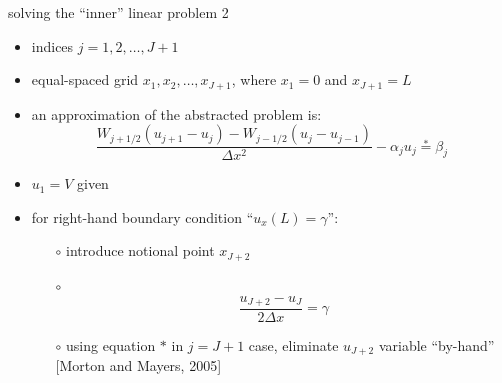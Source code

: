 \begin{frame}{solving the ``inner'' linear problem 2}

\begin{itemize}
\item indices $j=1,2,\dots,J+1$
\item equal-spaced grid $x_1,x_2,\dots,x_{J+1}$, where $x_1 = 0$ and $x_{J+1} = L$
\item an approximation of the abstracted problem is:
$$\frac{W_{j+1/2} (u_{j+1} - u_j) - W_{j-1/2} (u_{j} - u_{j-1})}{\Delta x^2} - \alpha_j u_j \stackrel{\ast}{=} \beta_j$$
\item $u_1 = V$ given
\item for right-hand boundary condition ``$u_x(L)=\gamma$'':
  \begin{itemize}
  \item[$\circ$] introduce notional point $x_{J+2}$
  \item[$\circ$]
    $$\frac{u_{J+2} - u_J}{2 \Delta x} = \gamma$$
  \item[$\circ$] using equation $\ast$ in $j=J+1$ case, eliminate $u_{J+2}$ variable ``by-hand'' [Morton and Mayers, 2005]
  \end{itemize}
\end{itemize}
\end{frame}


